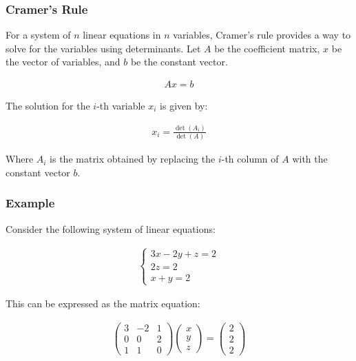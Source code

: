 \documentclass{article}
\begin{document}
\subsubsection{Cramer's Rule}

For a system of $n$ linear equations in $n$ variables, Cramer's rule provides a way to solve for the variables using determinants. Let $A$ be the coefficient matrix, $x$ be the vector of variables, and $b$ be the constant vector.

\begin{align*}
    Ax = b
\end{align*}

The solution for the $i$-th variable $x_i$ is given by:

\begin{align*}
    x_i = \frac{\det(A_i)}{\det(A)}
\end{align*}

Where $A_i$ is the matrix obtained by replacing the $i$-th column of $A$ with the constant vector $b$.

\subsubsection*{Example}
Consider the following system of linear equations:

\begin{align*}
    \begin{cases}
        3x - 2y + z = 2 \\
        2z = 2          \\
        x + y = 2
    \end{cases}
\end{align*}

This can be expressed as the matrix equation:

\begin{align*}
    \begin{pmatrix}
        3 & -2 & 1 \\
        0 & 0  & 2 \\
        1 & 1  & 0
    \end{pmatrix}
    \begin{pmatrix}
        x \\
        y \\
        z
    \end{pmatrix}
    =
    \begin{pmatrix}
        2 \\
        2 \\
        2
    \end{pmatrix}
\end{align*}
\end{document}
